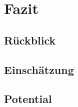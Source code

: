 \clearpage

\section{Fazit}

\subsection{Rückblick}
\subsection{Einschätzung}
\subsection{Potential}
